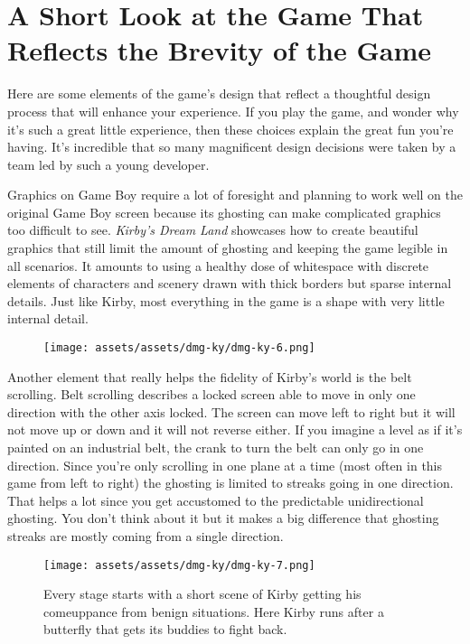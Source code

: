 \documentclass{book}
\begin{document}
\FloatBarrier\needspace{10mm}\section*{A Short Look at the Game That Reflects the Brevity of the Game}\nopagebreak[4]

Here are some elements of the game’s design that reflect a thoughtful design process that will enhance your experience. If you play the game, and wonder why it’s such a great little experience, then these choices explain the great fun you’re having. It’s incredible that so many magnificent design decisions were taken by a team led by such a young developer.

Graphics on Game Boy require a lot of foresight and planning to work well on the original Game Boy screen because its ghosting can make complicated graphics too difficult to see. \emph{Kirby’s Dream Land} showcases how to create beautiful graphics that still limit the amount of ghosting and keeping the game legible in all scenarios. It amounts to using a healthy dose of whitespace with discrete elements of characters and scenery drawn with thick borders but sparse internal details. Just like Kirby, most everything in the game is a shape with very little internal detail.

\begin{figure}[hbt]
\vskip 10pt
\centering \texttt{[image: assets/assets/dmg-ky/dmg-ky-6.png]}
\vskip 6pt
\end{figure}

Another element that really helps the fidelity of Kirby’s world is the belt scrolling. Belt scrolling describes a locked screen able to move in only one direction with the other axis locked. The screen can move left to right but it will not move up or down and it will not reverse either. If you imagine a level as if it’s painted on an industrial belt, the crank to turn the belt can only go in one direction. Since you’re only scrolling in one plane at a time (most often in this game from left to right) the ghosting is limited to streaks going in one direction. That helps a lot since you get accustomed to the predictable unidirectional ghosting. You don’t think about it but it makes a big difference that ghosting streaks are mostly coming from a single direction.

\begin{figure}[hbt]
\vskip 10pt
\centering \texttt{[image: assets/assets/dmg-ky/dmg-ky-7.png]}\par\pagetwodescription Every stage starts with a short scene of Kirby getting his comeuppance from benign situations. Here Kirby runs after a butterfly that gets its buddies to fight back.
\vskip 6pt
\end{figure}
\end{document}

